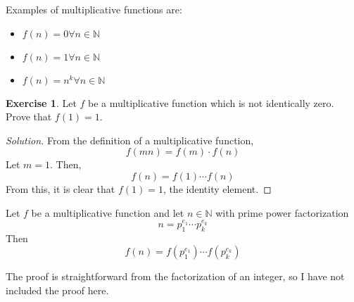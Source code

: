 \documentclass[12pt,letterpaper]{amsbook}
\theoremstyle{definition}
\newtheorem*{exercise}{Exercise}
\newenvironment{solution}
  {\renewcommand\qedsymbol{$\blacksquare$}\begin{proof}[Solution]}
  {\end{proof}}
\newcommand{\N}{\mathbb{N}}
\begin{document}
Examples of multiplicative functions are:
\begin{itemize}
  \item $f(n) = 0 \forall n \in \N$
  \item $f(n) = 1 \forall n \in \N$
  \item $f(n) = n^k \forall n \in \N$
\end{itemize}

\begin{exercise}
  Let $f$ be a multiplicative function which is not identically zero. Prove that $f(1) = 1$. 
\end{exercise}
\begin{solution}
 From the definition of a multiplicative function,
 \[f(mn) = f(m) \cdot f(n)\]
 Let $m = 1$. Then, 
 \[f(n) = f(1) \cdots f(n)\]
 From this, it is clear that $f(1) = 1$, the identity element.
\end{solution}

\begin{theorem}
  Let $f$ be a multiplicative function and let $n \in \N$ with prime power factorization
  \[n = p_1^{e_1} \cdots p_k^{e_k}\]
  Then
  \[f(n) = f(p_1^{e_1}) \cdots f(p_k^{e_k})\]
\end{theorem}

The proof is straightforward from the factorization of an integer, so I have not included the proof here.
\end{document}

